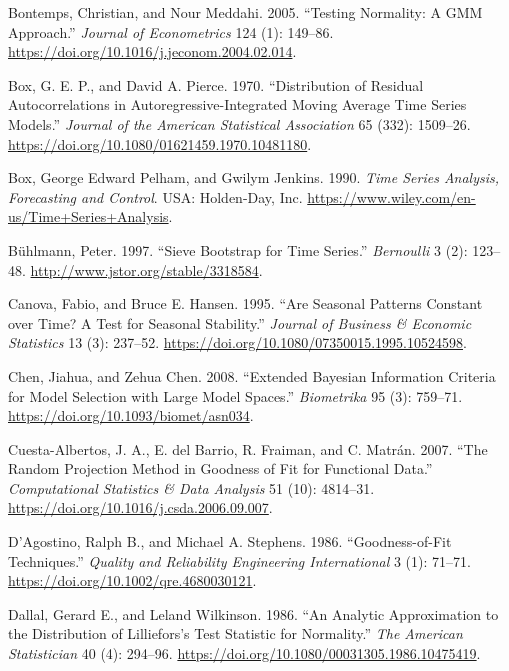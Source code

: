 \begin{CSLReferences}{1}{0}
\leavevmode{}%
Bontemps, Christian, and Nour Meddahi. 2005. {``Testing Normality: A GMM Approach.''} \emph{Journal of Econometrics} 124 (1): 149--86. \url{https://doi.org/10.1016/j.jeconom.2004.02.014}.

\leavevmode{}%
Box, G. E. P., and David A. Pierce. 1970. {``Distribution of Residual Autocorrelations in Autoregressive-Integrated Moving Average Time Series Models.''} \emph{Journal of the American Statistical Association} 65 (332): 1509--26. \url{https://doi.org/10.1080/01621459.1970.10481180}.

\leavevmode{}%
Box, George Edward Pelham, and Gwilym Jenkins. 1990. \emph{Time Series Analysis, Forecasting and Control}. USA: Holden-Day, Inc. \url{https://www.wiley.com/en-us/Time+Series+Analysis}.

\leavevmode{}%
Bühlmann, Peter. 1997. {``Sieve Bootstrap for Time Series.''} \emph{Bernoulli} 3 (2): 123--48. \url{http://www.jstor.org/stable/3318584}.

\leavevmode{}%
Canova, Fabio, and Bruce E. Hansen. 1995. {``Are Seasonal Patterns Constant over Time? A Test for Seasonal Stability.''} \emph{Journal of Business \& Economic Statistics} 13 (3): 237--52. \url{https://doi.org/10.1080/07350015.1995.10524598}.

\leavevmode{}%
Chen, Jiahua, and Zehua Chen. 2008. {``Extended Bayesian Information Criteria for Model Selection with Large Model Spaces.''} \emph{Biometrika} 95 (3): 759--71. \url{https://doi.org/10.1093/biomet/asn034}.

\leavevmode{}%
Cuesta-Albertos, J. A., E. del Barrio, R. Fraiman, and C. Matrán. 2007. {``The Random Projection Method in Goodness of Fit for Functional Data.''} \emph{Computational Statistics \& Data Analysis} 51 (10): 4814--31. \url{https://doi.org/10.1016/j.csda.2006.09.007}.

\leavevmode{}%
D'Agostino, Ralph B., and Michael A. Stephens. 1986. {``Goodness-of-Fit Techniques.''} \emph{Quality and Reliability Engineering International} 3 (1): 71--71. \url{https://doi.org/10.1002/qre.4680030121}.

\leavevmode{}%
Dallal, Gerard E., and Leland Wilkinson. 1986. {``An Analytic Approximation to the Distribution of Lilliefors's Test Statistic for Normality.''} \emph{The American Statistician} 40 (4): 294--96. \url{https://doi.org/10.1080/00031305.1986.10475419}.


\end{CSLReferences}
